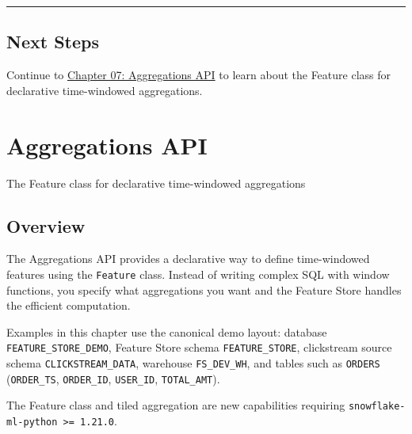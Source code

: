 \documentclass[
  letterpaper,
  DIV=11,
  numbers=noendperiod]{scrreprt}
\begin{document}
\begin{center}\rule{0.5\linewidth}{0.5pt}\end{center}

\hypertarget{next-steps-6}{%
\section{Next Steps}\label{next-steps-6}}

Continue to \protect\hyperlink{aggregations-api}{Chapter 07:
Aggregations API} to learn about the Feature class for declarative
time-windowed aggregations.

\hypertarget{aggregations-api}{%
\chapter{Aggregations API}\label{aggregations-api}}

The Feature class for declarative time-windowed aggregations

\hfill\break

\hypertarget{overview-7}{%
\section{Overview}\label{overview-7}}

The Aggregations API provides a declarative way to define time-windowed
features using the \texttt{Feature} class. Instead of writing complex
SQL with window functions, you specify what aggregations you want and
the Feature Store handles the efficient computation.

Examples in this chapter use the canonical demo layout: database
\texttt{FEATURE\_STORE\_DEMO}, Feature Store schema
\texttt{FEATURE\_STORE}, clickstream source schema
\texttt{CLICKSTREAM\_DATA}, warehouse \texttt{FS\_DEV\_WH}, and tables
such as \texttt{ORDERS} (\texttt{ORDER\_TS}, \texttt{ORDER\_ID},
\texttt{USER\_ID}, \texttt{TOTAL\_AMT}).

\begin{tcolorbox}[enhanced jigsaw, title=\textcolor{quarto-callout-note-color}{\faInfo}\hspace{0.5em}{🆕 New in snowflake-ml 1.21+}, colbacktitle=quarto-callout-note-color!10!white, rightrule=.15mm, arc=.35mm, colframe=quarto-callout-note-color-frame, left=2mm, bottomtitle=1mm, toptitle=1mm, breakable, bottomrule=.15mm, opacityback=0, titlerule=0mm, toprule=.15mm, opacitybacktitle=0.6, colback=white, coltitle=black, leftrule=.75mm]

The Feature class and tiled aggregation are new capabilities requiring
\texttt{snowflake-ml-python\ \textgreater{}=\ 1.21.0}.

\end{tcolorbox}
\end{document}
